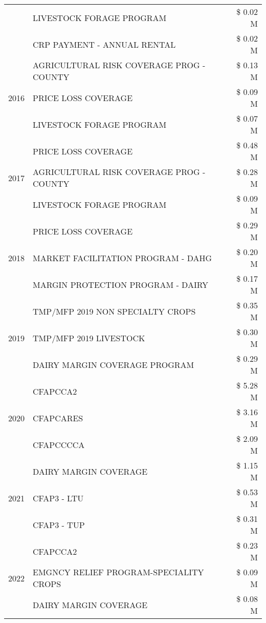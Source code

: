 \begin{tabular}{llr}
 & LIVESTOCK FORAGE PROGRAM & \$ 0.02 M \\
 & CRP PAYMENT - ANNUAL RENTAL & \$ 0.02 M \\
\cline{1-3}
\multirow[t]{3}{*}{2016} & AGRICULTURAL RISK COVERAGE PROG - COUNTY & \$ 0.13 M \\
 & PRICE LOSS COVERAGE & \$ 0.09 M \\
 & LIVESTOCK FORAGE PROGRAM & \$ 0.07 M \\
\cline{1-3}
\multirow[t]{3}{*}{2017} & PRICE LOSS COVERAGE & \$ 0.48 M \\
 & AGRICULTURAL RISK COVERAGE PROG - COUNTY & \$ 0.28 M \\
 & LIVESTOCK FORAGE PROGRAM & \$ 0.09 M \\
\cline{1-3}
\multirow[t]{3}{*}{2018} & PRICE LOSS COVERAGE & \$ 0.29 M \\
 & MARKET FACILITATION PROGRAM - DAHG & \$ 0.20 M \\
 & MARGIN PROTECTION PROGRAM - DAIRY & \$ 0.17 M \\
\cline{1-3}
\multirow[t]{3}{*}{2019} & TMP/MFP 2019 NON SPECIALTY CROPS & \$ 0.35 M \\
 & TMP/MFP 2019 LIVESTOCK & \$ 0.30 M \\
 & DAIRY MARGIN COVERAGE PROGRAM & \$ 0.29 M \\
\cline{1-3}
\multirow[t]{3}{*}{2020} & CFAPCCA2 & \$ 5.28 M \\
 & CFAPCARES & \$ 3.16 M \\
 & CFAPCCCCA & \$ 2.09 M \\
\cline{1-3}
\multirow[t]{3}{*}{2021} & DAIRY MARGIN COVERAGE & \$ 1.15 M \\
 & CFAP3 - LTU & \$ 0.53 M \\
 & CFAP3 - TUP & \$ 0.31 M \\
\cline{1-3}
\multirow[t]{3}{*}{2022} & CFAPCCA2 & \$ 0.23 M \\
 & EMGNCY RELIEF PROGRAM-SPECIALITY CROPS & \$ 0.09 M \\
 & DAIRY MARGIN COVERAGE & \$ 0.08 M \\
\cline{1-3}
\bottomrule
\end{tabular}
